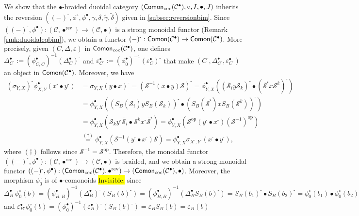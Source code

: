 \documentclass[nosumlimits,twoside]{amsart}
\theoremstyle{definition}
\theoremstyle{remark}
\def\rev{\mathrm{rev}}
\def\revsn{\text{-}}
\newenvironment{invisible}{{\noindent\sc \colorbox{yellow}{Invisible:}\;}\color{gray}}{\medskip}
\newcommand{\Cc}{\mathcal{C}}
\newcommand{\Ss}{\mathcal{S}}
\def\Comon{{\sf Comon}}
\def\cComon{{\sf Comon}_{\mathrm{coc}}}
\begin{document}
We show that the $\bullet$-braided duoidal category $(\cComon(\Cc^\bullet),\circ, I,\bullet,J)$ inherits the reversion $\left( \left( -\right) ^{\revsn },\phi^\circ ,\phi^{\bullet},\gamma ,\delta,\widetilde{\gamma},\widetilde{\delta}
\right) $ given in \cref{subsec:reversionbim}. Since $((-)^{\revsn},\phi^{\bullet}):\left( \mathcal{C},\bullet^\rev \right) \rightarrow \left( \mathcal{C},\bullet \right)$ is a strong monoidal functor (Remark \ref{rmk:duoidaleqbim}), we obtain a functor $(-)^{\revsn}:\Comon(\Cc^{\bullet})\to\Comon(\Cc^{\bullet})$. More precisely, given $(C,\Delta,\varepsilon)$ in $\cComon(\Cc^{\bullet})$, one defines $\Delta^{\bullet}_{C^{\revsn}}:=(\phi^{\bullet}_{C,C})^{-1}(\Delta_{C}^{\bullet})^{\revsn}$ and $\varepsilon^{\bullet}_{C^{\revsn}}:=(\phi^{\bullet}_{0})^{-1}(\varepsilon^{\bullet}_{C})^{\revsn}$ that make $(C^{\revsn},\Delta^{\bullet}_{C^{\revsn}},\varepsilon^{\bullet}_{C^{\revsn}})$ an object in $\Comon(\Cc^{\bullet})$. Moreover, we have
\[
\begin{split}
(\sigma_{Y,X})^{\revsn}\phi^{\bullet}_{X,Y}(x^{\revsn}\bullet y^{\revsn})&=\sigma_{Y,X}(y\bullet x)^{\revsn}=(\Ss^{-1}(x\bullet y)\Ss)^{\revsn}=\phi^{\bullet}_{Y,X}((\overline{\Ss}_{i}y\Ss_{k})^{\revsn}\bullet(\overline{\Ss}^{i}x\Ss^{k})^{\revsn})\\&=\phi^{\bullet}_{Y,X}((S_{B}(\overline{\Ss}_{i})yS_{B}(\Ss_{k}))^{\revsn}\bullet(S_{B}(\overline{\Ss}^{i})xS_{B}(\Ss^{k}))^{\revsn})\\&=\phi^{\bullet}_{Y,X}(\Ss_{k}y^{\revsn}\overline{\Ss}_{i}\bullet\Ss^{k}x^{\revsn}\overline{\Ss}^{i})=\phi^{\bullet}_{Y,X}(\Ss^{\mathrm{op}}(y^{\revsn}\bullet x^{\revsn})(\Ss^{-1})^{\mathrm{op}})\\&\overset{(\dag)}{=}\phi^{\bullet}_{Y,X}(\Ss^{-1}(y^{\revsn}\bullet x^{\revsn})\Ss)=\phi^{\bullet}_{Y,X}\sigma_{X^{\revsn},Y^{\revsn}}(x^{\revsn}\bullet y^{\revsn}),
\end{split}
\]
where $(\dag)$ follows since $\Ss^{-1}=\Ss^{\mathrm{op}}$. Therefore, the monoidal functor $((-)^{\revsn},\phi^{\bullet}):\left( \mathcal{C},\bullet^\rev \right) \rightarrow \left( \mathcal{C},\bullet \right)$ is braided, and we obtain a strong monoidal functor $((-)^{\revsn},\phi^{\bullet}):(\cComon(\Cc^{\bullet}),\bullet^\rev)\to(\cComon(\Cc^{\bullet}),\bullet)$. Moreover, the morphism $\phi^{\circ}_{0}$ is of $\bullet$-comonoids
\begin{invisible}
since
\[
\Delta^{\bullet}_{B^{\revsn}}\phi^{\circ}_{0}(b)=(\phi^{\bullet}_{B,B})^{-1}(\Delta_{B}^{\bullet})^{\revsn}(S_{B}(b)^{\revsn})=(\phi^{\bullet}_{B,B})^{-1}(\Delta_{B}^{\bullet}S_{B}(b)^{\revsn})=S_{B}(b_{1})^{\revsn}\bullet S_{B}(b_{2})^{\revsn}=\phi^{\circ}_{0}(b_{1})\bullet\phi^{\circ}_{0}(b_{2})
\]
and $\varepsilon_{B^{\revsn}}^{\bullet}\phi^{\circ}_{0}(b)=(\phi^{\bullet}_{0})^{-1}(\varepsilon^{\bullet}_{B})^{\revsn}(S_{B}(b)^{\revsn})=\varepsilon_{B}S_{B}(b)=\varepsilon_{B}(b)$
\end{invisible}
\end{document}
